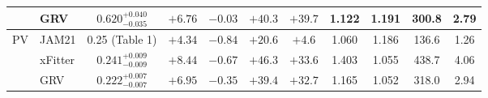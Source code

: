 \documentclass[11pt]{article}
\begin{document}
\begin{tabular}{llccccccccc}
 & GRV & $0.620^{+0.040}_{-0.035}$ & $+6.76$ & $-0.03$ & $+40.3$ & $+39.7$ & 1.122 & 1.191 & 300.8 & 2.79 \\
\midrule
\multirow{3}{*}{PV} & JAM21 & 0.25 (Table 1) & $+4.34$ & $-0.84$ & $+20.6$ & $+4.6$ & 1.060 & 1.186 & 136.6 & 1.26 \\
 & xFitter & $0.241^{+0.009}_{-0.009}$ & $+8.44$ & $-0.67$ & $+46.3$ & $+33.6$ & 1.403 & 1.055 & 438.7 & 4.06 \\
 & GRV & $0.222^{+0.007}_{-0.007}$ & $+6.95$ & $-0.35$ & $+39.4$ & $+32.7$ & 1.165 & 1.052 & 318.0 & 2.94 \\
\bottomrule
\end{tabular}
\end{document}
